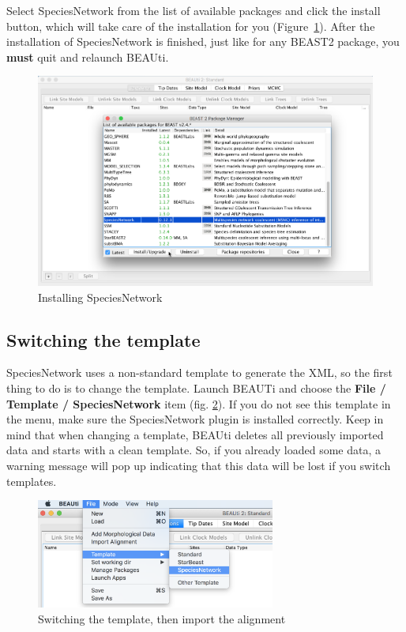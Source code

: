 \documentclass[11pt]{article}
\begin{document}
Select SpeciesNetwork from the list of available packages and click the install button, which will take
care of the installation for you (Figure~\ref{fig:installSpeciesNetwork}). After the installation of SpeciesNetwork is finished, just like for any BEAST2 package, you
\textbf{must} quit and relaunch BEAUti.

\begin{figure}[htb!]
\centering
\includegraphics[width=1.0\textwidth]{figs/installSpeciesNetwork.png}
\caption
{Installing SpeciesNetwork}
\label{fig:installSpeciesNetwork}
\end{figure}

\subsection*{Switching the template}

SpeciesNetwork uses a non-standard template to generate the XML, so the first thing to do is to change the template. Launch BEAUTi and choose the \textbf{File / Template / SpeciesNetwork} item (fig. \ref{fig_template}). If you do not see this template in the menu, make sure the SpeciesNetwork plugin is installed correctly.
Keep in mind that when changing a template, BEAUti deletes all previously imported data and starts with a clean template. So, if you already loaded some data, a warning message will pop up indicating that this data will be lost if you switch templates.

\begin{figure}[h]
\center
\includegraphics[width=0.7\textwidth]{figs/fig2_template.png}
\caption{Switching the template, then import the alignment}
\label{fig_template}
\end{figure}
\end{document}
